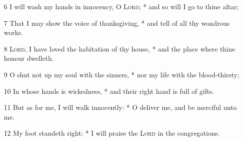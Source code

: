 6 I will wash my hands in innocency, O {\textsc{Lord}}; * and so will I go to thine altar;\par
7 That I may show the voice of thanksgiving, * and tell of all thy wondrous works.\par
8 {\textsc{Lord}}, I have loved the habitation of thy house, * and the place where thine honour dwelleth.\par
9 O shut not up my soul with the sinners, * nor my life with the blood-thirsty;\par
10 In whose hands is wickedness, * and their right hand is full of gifts.\par
11 But as for me, I will walk innocently: * O deliver me, and be merciful unto me.\par
12 My foot standeth right: * I will praise the {\textsc{Lord}} in the congregations.

